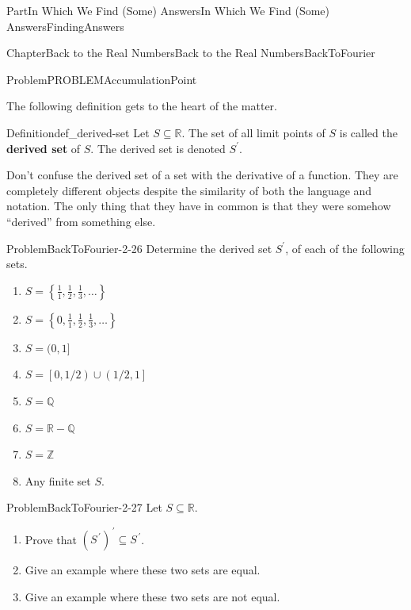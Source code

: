 \documentclass[oneside,10pt,]{book}
\newcommand{\terminology}[1]{\textbf{#1}}
\numberwithin{equation}{part}
\newcommand{\RR}{\mathbb {R}}
\newcommand{\QQ}{\mathbb {Q}}
\newcommand{\ZZ}{\mathbb {Z}}
\begin{document}
\begin{partptx}{Part}{In Which We Find (Some) Answers}{}{In Which We Find (Some) Answers}{}{}{FindingAnswers}
\begin{chapterptx}{Chapter}{Back to the Real Numbers}{}{Back to the Real Numbers}{}{}{BackToFourier}
\begin{introduction}{}
\begin{problem}{Problem}{}{PROBLEMAccumulationPoint}
\begin{equation*}
\end{equation*}
%
\end{problem}
The following definition gets to the heart of the matter.%
\begin{definition}{Definition}{}{def_derived-set}%
%
%
%
Let \(S\subseteq\RR\).  The set of all limit points of \(S\) is called the \terminology{derived set} of \(S\). The derived set is denoted \(S^{\prime}\).%
\end{definition}
Don't confuse the derived set of a set with the derivative of a function.  They are completely different objects despite the similarity of both the language and notation.  The only thing that they have in common is that they were somehow ``derived'' from something else.%
\begin{problem}{Problem}{}{BackToFourier-2-26}%
Determine the derived set \(S^\prime\), of each of the following sets.%
\begin{multicols}{2}
\begin{enumerate}[label={(\alph*)}]
\item{}\(\displaystyle S=\left\{\frac11, \frac12, \frac13, \ldots\right\}\)%
\item{}\(\displaystyle S=\left\{0,\frac11, \frac12, \frac13, \ldots\right\}\)%
\item{}\(\displaystyle S=(0,1]\)%
\item{}\(\displaystyle S=\left[\left.0,1/2\right)\right.\cup\left.\left(1/2,1\right.\right]\)%
\item{}\(\displaystyle S=\QQ\)%
\item{}\(\displaystyle S=\RR-\QQ\)%
\item{}\(\displaystyle S=\ZZ\)%
\item{}Any finite set \(S\).%
\end{enumerate}
\end{multicols}
%
\end{problem}
\begin{problem}{Problem}{}{BackToFourier-2-27}%
Let \(S\subseteq\RR\).%
\begin{enumerate}[label={(\alph*)}]
\item{}Prove that \(\left(S^{\,\prime}\right)^{\,\prime}\subseteq
S^{\,\prime}\).%
\item{}Give an example where these two sets are equal.%
\item{}Give an example where these two sets are not equal.%
\end{enumerate}

\end{problem}
\end{introduction}
\end{chapterptx}
\end{partptx}
\end{document}
